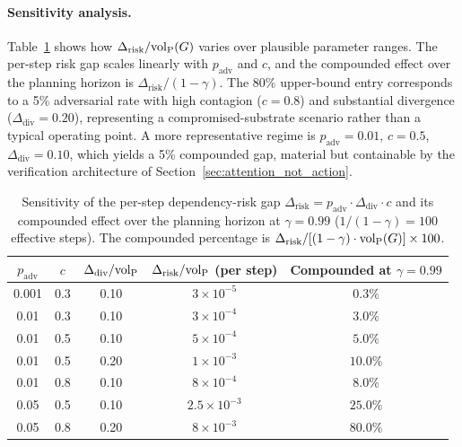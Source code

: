 \paragraph{Sensitivity analysis.} Table~\ref{tab:sensitivity} shows
how $\Delta_{\mathrm{risk}} / {\operatorname{vol}_{\mathrm{P}}}(G)$ varies over plausible
parameter ranges. The per-step risk gap scales linearly with
$p_{\mathrm{adv}}$ and $c$, and the compounded effect over the
planning horizon is $\Delta_{\mathrm{risk}} / (1 - \gamma)$.
The 80\% upper-bound entry corresponds to a 5\% adversarial rate
with high contagion ($c = 0.8$) and substantial divergence
($\Delta_{\mathrm{div}} = 0.20$), representing a
compromised-substrate scenario rather than a typical operating
point. A more representative regime is
$p_{\mathrm{adv}} = 0.01$, $c = 0.5$, $\Delta_{\mathrm{div}} =
0.10$, which yields a 5\% compounded gap, material but
containable by the verification architecture of
Section~\ref{sec:attention_not_action}.

\begin{table}[h]
\centering
\small
\begin{tabular}{@{}ccccc@{}}
\toprule
$p_{\mathrm{adv}}$ & $c$ & $\Delta_{\mathrm{div}}/{\operatorname{vol}_{\mathrm{P}}}$ & $\Delta_{\mathrm{risk}}/{\operatorname{vol}_{\mathrm{P}}}$ (per step) & Compounded at $\gamma = 0.99$ \\
\midrule
0.001 & 0.3 & 0.10 & $3 \times 10^{-5}$   & $0.3\%$ \\
0.01  & 0.3 & 0.10 & $3 \times 10^{-4}$   & $3.0\%$ \\
0.01  & 0.5 & 0.10 & $5 \times 10^{-4}$   & $5.0\%$ \\
0.01  & 0.5 & 0.20 & $1 \times 10^{-3}$   & $10.0\%$ \\
0.01  & 0.8 & 0.10 & $8 \times 10^{-4}$   & $8.0\%$ \\
0.05  & 0.5 & 0.10 & $2.5 \times 10^{-3}$ & $25.0\%$ \\
0.05  & 0.8 & 0.20 & $8 \times 10^{-3}$   & $80.0\%$ \\
\bottomrule
\end{tabular}
\caption{Sensitivity of the per-step dependency-risk gap
    $\Delta_{\mathrm{risk}} = p_{\mathrm{adv}} \cdot
    \Delta_{\mathrm{div}} \cdot c$ and its compounded effect over
    the planning horizon at $\gamma = 0.99$
    ($1/(1 - \gamma) = 100$ effective steps). The compounded
    percentage is $\Delta_{\mathrm{risk}} / [(1 - \gamma) \cdot
    {\operatorname{vol}_{\mathrm{P}}}(G)] \times 100$.}
\label{tab:sensitivity}
\end{table}

